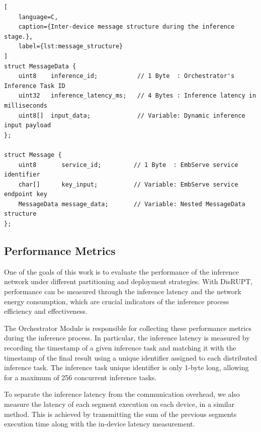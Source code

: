 \begin{lstlisting}[
    language=C,
    caption={Inter-device message structure during the inference stage.},
    label={lst:message_structure}
]
struct MessageData {
    uint8    inference_id;           // 1 Byte  : Orchestrator's Inference Task ID
    uint32   inference_latency_ms;   // 4 Bytes : Inference latency in milliseconds
    uint8[]  input_data;             // Variable: Dynamic inference input payload
};

struct Message {
    uint8       service_id;         // 1 Byte  : EmbServe service identifier
    char[]      key_input;          // Variable: EmbServe service endpoint key
    MessageData message_data;       // Variable: Nested MessageData structure
};
\end{lstlisting}

\subsection{Performance Metrics}\label{sec:se452}



One of the goals of this work is to evaluate the performance of the inference
network under different partitioning and deployment strategies. With \ac{DisRUPT}, 
performance can be measured through the inference latency and the network energy
consumption, which are crucial indicators of the inference process efficiency and 
effectiveness.

The Orchestrator Module is responsible for collecting these performance metrics during
the inference process. In particular, the inference latency is measured by recording
the timestamp of a given inference task and matching it with the timestamp of the final
result using a unique identifier assigned to each distributed inference task. The
inference task unique identifier is only 1-byte long, allowing for a maximum of 256
concurrent inference tasks.

To separate the inference latency from the communication overhead, we also measure the
latency of each segment execution on each device, in a similar method. This is achieved
by transmitting the sum of the previous segments execution time along with the
in-device latency measurement.

